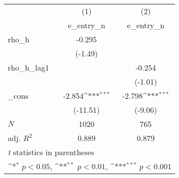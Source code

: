 {
\def\sym#1{\ifmmode^{#1}\else\(^{#1}\)\fi}
\begin{tabular}{l*{2}{c}}
\toprule
            &\multicolumn{1}{c}{(1)}&\multicolumn{1}{c}{(2)}\\
            &\multicolumn{1}{c}{e\_entry\_n}&\multicolumn{1}{c}{e\_entry\_n}\\
\midrule
rho\_h       &      -0.295         &                     \\
            &     (-1.49)         &                     \\
\addlinespace
rho\_h\_lag1  &                     &      -0.254         \\
            &                     &     (-1.01)         \\
\addlinespace
\_cons      &      -2.854\sym{***}&      -2.798\sym{***}\\
            &    (-11.51)         &     (-9.06)         \\
\midrule
\(N\)       &        1020         &         765         \\
adj. \(R^{2}\)&       0.889         &       0.879         \\
\bottomrule
\multicolumn{3}{l}{\footnotesize \textit{t} statistics in parentheses}\\
\multicolumn{3}{l}{\footnotesize \sym{*} \(p<0.05\), \sym{**} \(p<0.01\), \sym{***} \(p<0.001\)}\\
\end{tabular}
}
